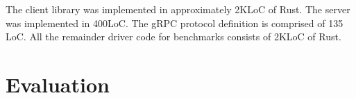The client library was implemented in approximately 2KLoC of
Rust. The server was implemented in 400LoC. The gRPC protocol
definition is comprised of 135 LoC. All the remainder driver code
for benchmarks consists of 2KLoC of Rust.

\section{Evaluation}\label{sec:r2s2evaluation}

